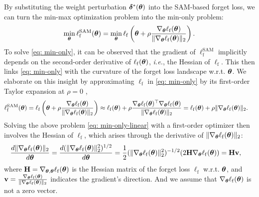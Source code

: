 By substituting the weight perturbation $\boldsymbol\delta^*({\boldsymbol{\theta}})$ into the SAM-based forget loss, we can turn the min-max optimization problem  into the min-only problem:
\begin{align}
 \min_{{\boldsymbol{\theta}}} \ell^{\mathrm{SAM}}_{\mathrm{f}} ({\boldsymbol{\theta}}) = \min_{{\boldsymbol{\theta}}} \ell_{\mathrm{f}} \left ({\boldsymbol{\theta}} + \rho \frac{\nabla_{{\boldsymbol{\theta}}} \ell_{\mathrm{f}} ({\boldsymbol{\theta}} )}{ \| \nabla_{{\boldsymbol{\theta}}} \ell_{\mathrm{f}} ({\boldsymbol{\theta}} ) \|_2} \right ).
 \label{eq: min-only}
\end{align}
To solve \eqref{eq: min-only}, it can be observed that the gradient of $\ell^{\mathrm{SAM}}_{\mathrm{f}}$ implicitly depends on the second-order derivative of $\ell_{\mathrm{f}} ({\boldsymbol{\theta}})$, \textit{i.e.}, the Hessian of $\ell_{\mathrm{f}}$. This then links \eqref{eq: min-only} with the curvature
of the forget loss landscape w.r.t. ${\boldsymbol{\theta}}$. We elaborate on this insight by approximating $\ell_{\mathrm{f}}$ in \eqref{eq: min-only} by its first-order
Taylor expansion at $\rho = 0$ \citep{dauphin2024neglected}, 
\begin{align}
\raisetag{6mm}
       & \ell^{\mathrm{SAM}}_{\mathrm{f}} (\btheta) =  \ell_{\mathrm{f}} \left (\btheta + \rho \frac{\nabla_{\btheta} \ell_{\mathrm{f}} (\btheta )}{ \| \nabla_{\btheta} \ell_{\mathrm{f}} (\btheta ) \|_2} \right ) %
   \approx %
   \ell_{\mathrm{f}} (\btheta) + \rho \frac{\nabla_{\btheta} \ell_{\mathrm{f}}(\btheta)^\top  
 \nabla_{\btheta} \ell_{\mathrm{f}} (\btheta )}{ \| \nabla_{\btheta} \ell_{\mathrm{f}} (\btheta ) \|_2}  = \ell_{\mathrm{f}} (\btheta) + \rho \| \nabla_{\btheta} \ell_{\mathrm{f}} (\btheta ) \|_2.
  \label{eq: min-only-linear}
\end{align}
Solving the above problem \eqref{eq: min-only-linear} with a first-order optimizer then involves the Hessian of $\ell_{\mathrm{f}}$, which arises through the derivative of $ 
\| \nabla_{{\boldsymbol{\theta}}} \ell_{\mathrm{f}} ({\boldsymbol{\theta}} ) \|_2$:
\begin{align}
&\frac{d \| \nabla_{\btheta} \ell_{\mathrm{f}} (\btheta ) \|_2}{d \btheta} = \frac{d (\| \nabla_{\btheta} \ell_{\mathrm{f}} (\btheta ) \|_2^2)^{1/2}}{d \btheta} 
=  %
\frac{1}{2} (\| \nabla_{\btheta} \ell_{\mathrm{f}} (\btheta ) \|_2^2)^{-1/2} (2 \mathbf H  \nabla_{\btheta} \ell_{\mathrm{f}} (\btheta ) ) = \mathbf H \mathbf v,
\label{eq: curvature_reg}
\end{align}
where $\mathbf H = \nabla_{{\boldsymbol{\theta}}, {\boldsymbol{\theta}}} \ell_{\mathrm{f}}({\boldsymbol{\theta}})$ is the Hessian matrix of the forget loss $\ell_{\mathrm{f}}$ w.r.t. ${\boldsymbol{\theta}}$, and $\mathbf v = \frac{   \nabla_{{\boldsymbol{\theta}}} \ell_{\mathrm{f}}  ({\boldsymbol{\theta}} )}{\| \nabla_{{\boldsymbol{\theta}}} \ell_{\mathrm{f}} ({\boldsymbol{\theta}} ) \|_2}$ indicates the gradient's direction. And we assume that $\nabla_{{\boldsymbol{\theta}}} \ell_{\mathrm{f}} ({\boldsymbol{\theta}} ) $ is not a zero vector.

